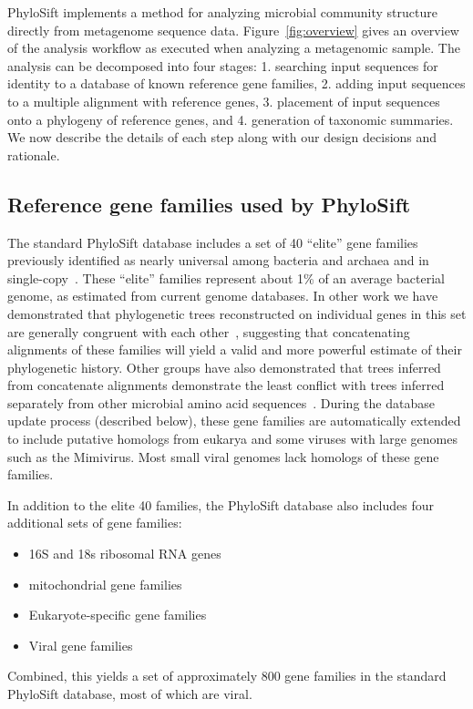 \documentclass[10pt]{article}
\begin{document}
PhyloSift implements a method for analyzing microbial community structure directly from metagenome sequence data.
Figure~\ref{fig:overview} gives an overview of the analysis workflow as executed when analyzing a metagenomic sample.
The analysis can be decomposed into four stages: 1. searching input sequences for identity to a database of known reference gene families, 2. adding input sequences to a multiple alignment with reference genes, 3. placement of input sequences onto a phylogeny of reference genes, and 4. generation of taxonomic summaries. We now describe the details of each step along with our design decisions and rationale.


\subsection*{Reference gene families used by PhyloSift}

The standard PhyloSift database includes a set of 40 ``elite'' gene families previously identified as nearly universal among bacteria and archaea and in single-copy~\cite{DongyingWu2012}.
These ``elite'' families represent about 1\% of an average bacterial genome, as estimated from current genome databases.
In other work we have demonstrated that phylogenetic trees reconstructed on individual genes in this set are generally congruent with each other~\cite{Lang2012}, suggesting that concatenating alignments of these families will yield a valid and more powerful estimate of their phylogenetic history.
Other groups have also demonstrated that trees inferred from concatenate alignments demonstrate the least conflict with trees inferred separately from other microbial amino acid sequences~\cite{Abby2012}.
During the database update process (described below), these gene families are automatically extended to include putative homologs from eukarya and some viruses with large genomes such as the Mimivirus.
Most small viral genomes lack homologs of these gene families.

In addition to the elite 40 families, the PhyloSift database also includes four additional sets of gene families:
\begin{itemize}
\item 16S and 18s ribosomal {RNA} genes
\item mitochondrial gene families
\item Eukaryote-specific gene families
\item Viral gene families
\end{itemize}
Combined, this yields a set of approximately 800 gene families in the standard PhyloSift database, most of which are viral.
\end{document}
